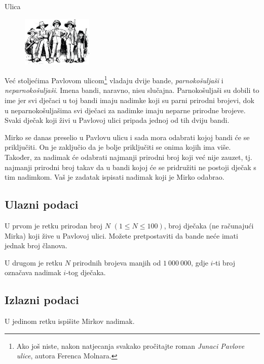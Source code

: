 \begin{statement}[
  problempoints=30,
  timelimit=1 sekunda,
  memorylimit=512 MiB,
]{Ulica}

\setlength\intextsep{-0.1cm}
\begin{figure}
\centering
\includegraphics[width=0.3\textwidth]{img/ulica.png}
\end{figure}

Već stoljećima Pavlovom ulicom\footnote{Ako još niste, nakon natjecanja svakako
pročitajte roman \textit{Junaci Pavlove ulice}, autora Ferenca Molnara.}
vladaju dvije bande, \textit{parnokošuljaši} i \textit{neparnokošuljaši}.
Imena bandi, naravno, nisu slučajna. Parnokošuljaši su dobili to ime jer svi
dječaci u toj bandi imaju nadimke koji su parni prirodni brojevi, dok u
neparnokošuljašima svi dječaci za nadimke imaju neparne prirodne brojeve.
Svaki dječak koji živi u Pavlovoj ulici pripada jednoj od tih dviju bandi.

Mirko se danas preselio u Pavlovu ulicu i sada mora odabrati kojoj bandi će se
priključiti. On je zaključio da je bolje priključiti se onima kojih ima više.
Također, za nadimak će odabrati najmanji prirodni broj koji već nije zauzet,
tj. najmanji prirodni broj takav da u bandi kojoj će se pridružiti ne postoji
dječak s tim nadimkom. Vaš je zadatak ispisati nadimak koji je Mirko odabrao.


\subsection*{Ulazni podaci}
U prvom je retku prirodan broj $N$ $(1 \le N \le 100)$, broj dječaka (ne
računajući Mirka) koji žive u Pavlovoj ulici. Možete pretpostaviti da bande
neće imati jednak broj članova.

U drugom je retku $N$ prirodnih brojeva manjih od $1\ 000\ 000$, gdje $i$-ti
broj označava nadimak $i$-tog dječaka.

\subsection*{Izlazni podaci}
U jedinom retku ispišite Mirkov nadimak.


\end{statement}
